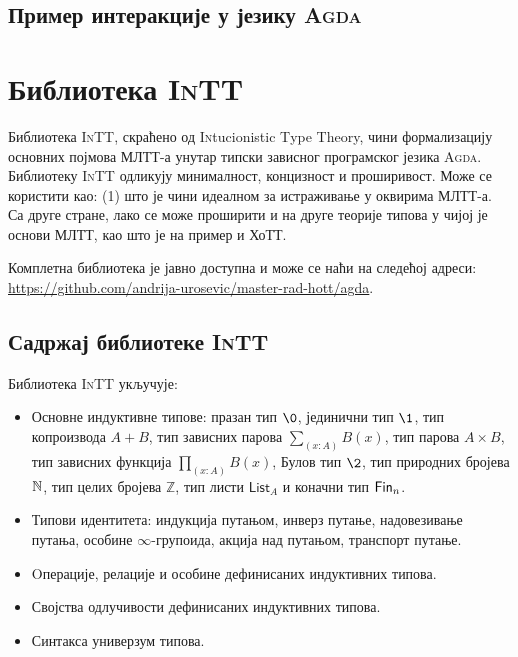 \documentclass[12pt,oneside]{memoir}
\begin{document}
\section{Пример интеракције у језику \textsc{Agda}}
\label{sec:ex}



\chapter{Библиотека \textsc{InTT}}

Библиотека \textsc{InTT}, скраћено од \textsc{In}tucionistic \textsc{T}ype \textsc{T}heory, чини формализацију основних појмова МЛТТ-а унутар типски зависног програмског језика \textsc{Agda}. Библиотеку \textsc{InTT} одликују минималност, концизност и проширивост. Може се користити као: (1) што је чини идеалном за истраживање у оквирима МЛТТ-а. Са друге стране, лако се може проширити и на друге теорије типова у чијој је основи МЛТТ, као што је на пример и ХоТТ. 

Комплетна библиотека је јавно доступна и може се наћи на следећој адреси: \url{https://github.com/andrija-urosevic/master-rad-hott/agda}. 

\section{Садржај библиотеке \textsc{InTT}}

Библиотека \textsc{InTT} укључује:
\begin{itemize}
    \item{Основне индуктивне типове: празан тип $\0$, јединични тип $\1$, тип копроизвода $A + B$, тип зависних парова $\sum_{(x : A)} B(x)$, тип парова $A \times B$, тип зависних функција $\prod_{(x : A)} B(x)$, Булов тип $\2$, тип природних бројева ${\mathbb{N}}$, тип целих бројева $\mathbb{Z}$, тип листи $\mathsf{List}_{A}$ и коначни тип $\mathsf{Fin}_{n}$.}
    \item{Типови идентитета: индукција путањом, инверз путање, надовезивање путања, особине $\infty$-групоида, акција над путањом, транспорт путање.}
    \item{Oперације, релације и особине дефинисаних индуктивних типова.}
    \item{Својства одлучивости дефинисаних индуктивних типова.}
    \item{Синтакса универзум типова.}
\end{itemize}
\end{document}
